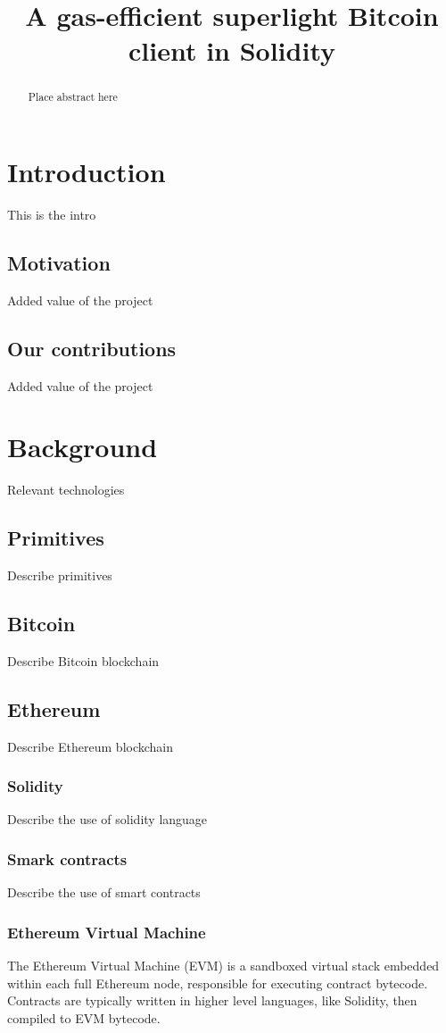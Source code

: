 \documentclass{article}
\title{A gas-efficient superlight Bitcoin client in Solidity}
\begin{document}
\maketitle

\begin{abstract}
Place abstract here
\end{abstract}

\section{Introduction}
This is the intro
\subsection{Motivation}
Added value of the project
\subsection{Our contributions}
Added value of the project

\section{Background}
Relevant technologies
\subsection{Primitives}
Describe primitives
\subsection{Bitcoin}
Describe Bitcoin blockchain
\subsection{Ethereum}
Describe Ethereum blockchain
\subsubsection{Solidity}
Describe the use of solidity language
\subsubsection{Smark contracts}
Describe the use of smart contracts
\subsubsection{Ethereum Virtual Machine}
The Ethereum Virtual Machine (EVM) is a sandboxed virtual stack embedded within each full Ethereum node, responsible for executing contract bytecode. Contracts are typically written in higher level languages, like Solidity, then compiled to EVM bytecode.
\end{document}
